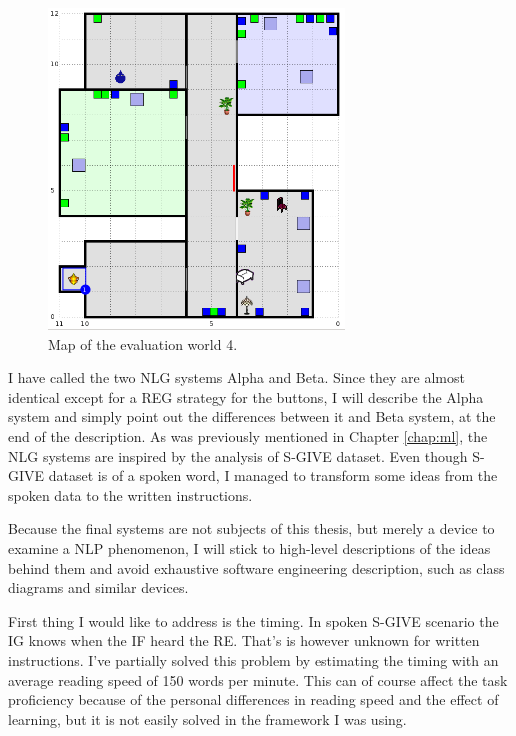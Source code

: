 \begin{figure}[!htbp]
  \centering
	\includegraphics[width=0.7\textwidth]{Images/experiment-world-5}
	\caption{Map of the evaluation world 4.}
	\label{fig:exper-world4}
\end{figure}

I have called the two NLG systems Alpha and Beta. Since they are almost identical except for a REG strategy for the buttons, I will describe the Alpha system and simply point out the differences between it and Beta system, at the end of the description. As was previously mentioned in Chapter \ref{chap:ml}, the NLG systems are inspired by the analysis of S-GIVE dataset. Even though S-GIVE dataset is of a spoken word, I managed to transform some ideas from the spoken data to the written instructions.

Because the final systems are not subjects of this thesis, but merely a device to examine a NLP phenomenon, I will stick to high-level descriptions of the ideas behind them and avoid exhaustive software engineering description, such as class diagrams and similar devices.

First thing I would like to address is the timing. In spoken S-GIVE scenario the IG knows when the IF heard the RE. That's is however unknown for written instructions. I've partially solved this problem by estimating the timing with an average reading speed of 150 words per minute. This can of course affect the task proficiency because of the personal differences in reading speed and the effect of learning, but it is not easily solved in the framework I was using.

